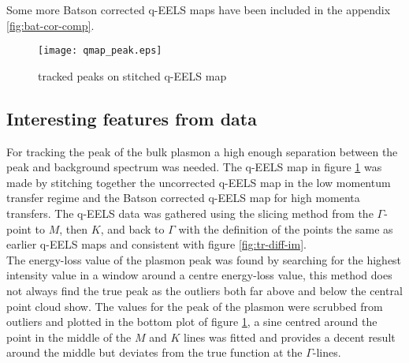 Some more Batson corrected q-EELS maps have been included in the appendix \ref{fig:bat-cor-comp}.
%
\begin{figure}[t]
	\centering
	\texttt{[image: qmap\_peak.eps]}
	\caption{tracked peaks on stitched q-EELS map}
	\label{fig:qmap-track}
\end{figure}
%
\subsection{Interesting features from data}
%
For tracking the peak of the bulk plasmon a high enough separation between the peak and background spectrum was needed. The q-EELS map in figure \ref{fig:qmap-track} was made by stitching together the uncorrected q-EELS map in the low momentum transfer regime and the Batson corrected q-EELS map for high momenta transfers. The q-EELS data was gathered using the slicing method from the $\Gamma$-point to $M$, then $K$, and back to $\Gamma$ with the definition of the points the same as earlier q-EELS maps and consistent with figure \ref{fig:tr-diff-im}.\\
The energy-loss value of the plasmon peak was found by searching for the highest intensity value in a window around a centre energy-loss value, this method does not always find the true peak as the outliers both far above and below the central point cloud show. The values for the peak of the plasmon were scrubbed from outliers and plotted in the bottom plot of figure \ref{fig:qmap-track}, a sine centred around the point in the middle of the $M$ and $K$ lines was fitted and provides a decent result around the middle but deviates from the true function at the $\Gamma$-lines.\\
%
